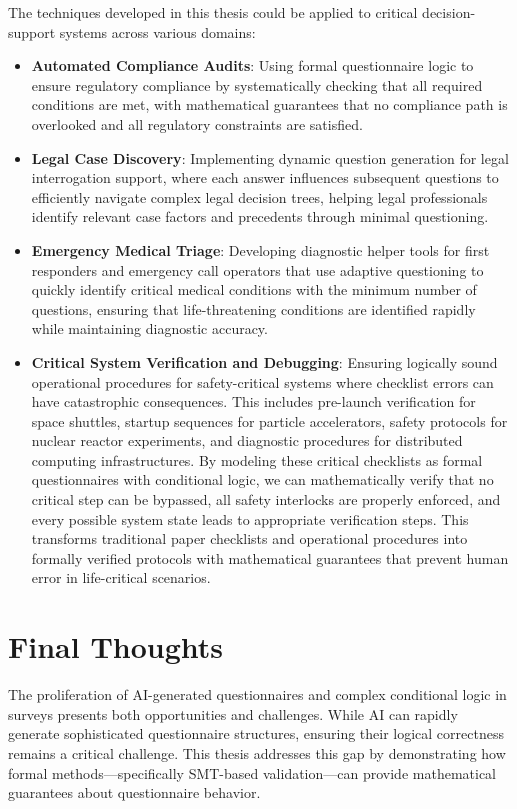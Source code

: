 The techniques developed in this thesis could be applied to critical decision-support systems across various domains:

\begin{itemize}
    \item \textbf{Automated Compliance Audits}: Using formal questionnaire logic to ensure regulatory compliance by systematically checking that all required conditions are met, with mathematical guarantees that no compliance path is overlooked and all regulatory constraints are satisfied.
    \item \textbf{Legal Case Discovery}: Implementing dynamic question generation for legal interrogation support, where each answer influences subsequent questions to efficiently navigate complex legal decision trees, helping legal professionals identify relevant case factors and precedents through minimal questioning.
    \item \textbf{Emergency Medical Triage}: Developing diagnostic helper tools for first responders and emergency call operators that use adaptive questioning to quickly identify critical medical conditions with the minimum number of questions, ensuring that life-threatening conditions are identified rapidly while maintaining diagnostic accuracy.
    \item \textbf{Critical System Verification and Debugging}: Ensuring logically sound operational procedures for safety-critical systems where checklist errors can have catastrophic consequences. This includes pre-launch verification for space shuttles, startup sequences for particle accelerators, safety protocols for nuclear reactor experiments, and diagnostic procedures for distributed computing infrastructures. By modeling these critical checklists as formal questionnaires with conditional logic, we can mathematically verify that no critical step can be bypassed, all safety interlocks are properly enforced, and every possible system state leads to appropriate verification steps. This transforms traditional paper checklists and operational procedures into formally verified protocols with mathematical guarantees that prevent human error in life-critical scenarios.
\end{itemize}

\section{Final Thoughts}

The proliferation of AI-generated questionnaires and complex conditional logic in surveys presents both opportunities and challenges. While AI can rapidly generate sophisticated questionnaire structures, ensuring their logical correctness remains a critical challenge. This thesis addresses this gap by demonstrating how formal methods—specifically SMT-based validation—can provide mathematical guarantees about questionnaire behavior.

